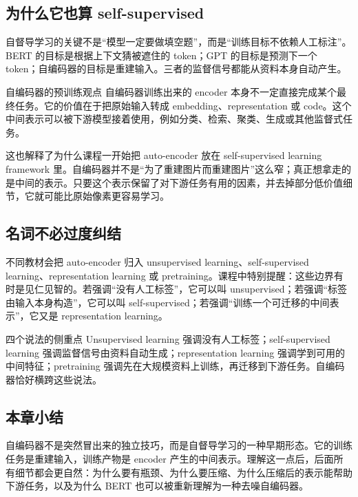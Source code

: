 \documentclass[a4paper]{article}
\begin{document}
\subsection{为什么它也算 self-supervised}

自督导学习的关键不是“模型一定要做填空题”，而是“训练目标不依赖人工标注”。BERT 的目标是根据上下文猜被遮住的 token；GPT 的目标是预测下一个 token；自编码器的目标是重建输入。三者的监督信号都能从资料本身自动产生。

\begin{importantbox}{自编码器的预训练观点}
    自编码器训练出来的 encoder 本身不一定直接完成某个最终任务。它的价值在于把原始输入转成 embedding、representation 或 code。这个中间表示可以被下游模型接着使用，例如分类、检索、聚类、生成或其他监督式任务。
\end{importantbox}

这也解释了为什么课程一开始把 auto-encoder 放在 self-supervised learning framework 里。自编码器并不是“为了重建图片而重建图片”这么窄；真正想拿走的是中间的表示。只要这个表示保留了对下游任务有用的因素，并去掉部分低价值细节，它就可能比原始像素更容易学习。

\subsection{名词不必过度纠结}

不同教材会把 auto-encoder 归入 unsupervised learning、self-supervised learning、representation learning 或 pretraining。课程中特别提醒：这些边界有时是见仁见智的。若强调“没有人工标签”，它可以叫 unsupervised；若强调“标签由输入本身构造”，它可以叫 self-supervised；若强调“训练一个可迁移的中间表示”，它又是 representation learning。

\begin{knowledgebox}{四个说法的侧重点}
    Unsupervised learning 强调没有人工标签；self-supervised learning 强调监督信号由资料自动生成；representation learning 强调学到可用的中间特征；pretraining 强调先在大规模资料上训练，再迁移到下游任务。自编码器恰好横跨这些说法。
\end{knowledgebox}

\subsection{本章小结}

自编码器不是突然冒出来的独立技巧，而是自督导学习的一种早期形态。它的训练任务是重建输入，训练产物是 encoder 产生的中间表示。理解这一点后，后面所有细节都会更自然：为什么要有瓶颈、为什么要压缩、为什么压缩后的表示能帮助下游任务，以及为什么 BERT 也可以被重新理解为一种去噪自编码器。
\end{document}
